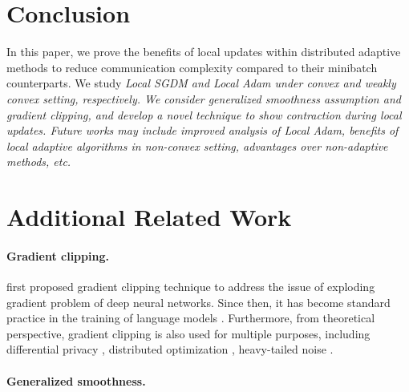 \documentclass{article} %
\numberwithin{equation}{section}
\begin{document}
\section{Conclusion}
     In this paper, we prove the benefits of local updates within distributed adaptive methods to reduce communication complexity compared to their minibatch counterparts. 
     We study \em Local \em SGDM and \em Local \em Adam under convex and weakly convex setting, respectively.
     We consider generalized smoothness assumption and gradient clipping, and develop a novel technique to show contraction during local updates.
     Future works may include improved analysis of \em Local \em Adam, benefits of local adaptive algorithms in non-convex setting, advantages over non-adaptive methods, etc.




\newpage

\appendix

\section{Additional Related Work}

\paragraph{Gradient clipping.}

\cite{pascanu2013difficulty} first proposed gradient clipping technique to address the issue of exploding gradient
problem of deep neural networks. 
Since then, it has become standard practice in the training of language models \citep{gehring2017convolutional, merity2017regularizing, zhang2022opt, liu2023sophia}. 
Furthermore, from theoretical perspective, gradient clipping is also used for multiple purposes, including differential privacy \citep{abadi2016deep}, distributed optimization \citep{karimireddy2021learning, liu2022communication}, heavy-tailed noise \citep{zhang2020adaptive}.

\paragraph{Generalized smoothness.}
\end{document}
